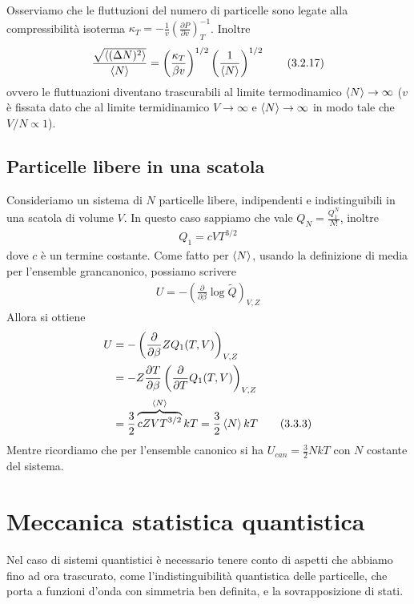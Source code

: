 \documentclass{article}
\begin{document}
Osserviamo che le fluttuzioni del numero di particelle sono legate alla compressibilità isoterma $\kappa_T = -\frac{1}{v}\left(\frac{\partial P}{\partial v}\right)^{-1}_T$. Inoltre
\begin{align}
    \frac{\sqrt{\braket{(\Delta N)^2}}}{\braket{N}} = \left(\frac{\kappa_T}{\beta v}\right)^{1/2}\left(\frac{1}{\braket{N}}\right)^{1/2} \tag{3.2.17}
\end{align}
ovvero le fluttuazioni diventano trascurabili al limite termodinamico $\braket{N} \rightarrow \infty$ ($v$ è fissata dato che al limite termidinamico $V \rightarrow \infty$ e $\braket{N} \rightarrow \infty$ in modo tale che $V/N \propto 1$).




\newpage
\subsection{Particelle libere in una scatola}
Consideriamo un sistema di $N$ particelle libere, indipendenti e indistinguibili in una scatola di volume $V$. In questo caso sappiamo che vale $Q_N = \frac{Q^N_1}{N!}$, inoltre 
\begin{align}
    Q_1 = cVT^{3/2} \tag{3.3.1}
\end{align}
dove $c$ è un termine costante. Come fatto per $\braket{N}$, usando la definizione di media per l'ensemble grancanonico, possiamo scrivere 
\begin{align}
    U = -\left(\frac{\partial}{\partial \beta}\log\tilde{Q}\right)_{V, Z} \tag{3.3.2}
\end{align}
Allora si ottiene 
\begin{align}
    U &= -\left(\frac{\partial}{\partial \beta}ZQ_1(T, V)\right)_{V, Z} \notag \\
    &= -Z\frac{\partial T}{\partial \beta} \left(\frac{\partial}{\partial T}Q_1(T, V)\right)_{V, Z} \notag \\
    &= \frac{3}{2}\overbrace{cZVT^{3/2}}^{\braket{N}}kT = \frac{3}{2}\braket{N}kT \tag{3.3.3}
\end{align}
Mentre ricordiamo che per l'ensemble canonico si ha $U_{can} = \frac{3}{2}NkT$ con $N$ costante del sistema.

\newpage
\section{Meccanica statistica quantistica}
Nel caso di sistemi quantistici è necessario tenere conto di aspetti che abbiamo fino ad ora trascurato, come l'indistinguibilità quantistica delle particelle, che porta a funzioni d'onda con simmetria ben definita, e la sovrapposizione di stati.
\end{document}
